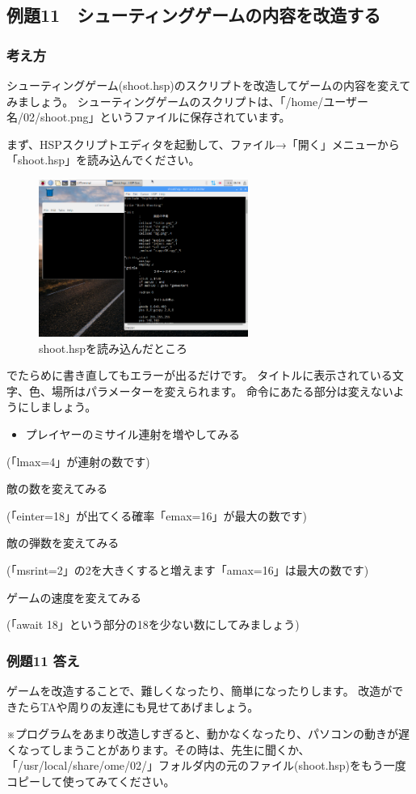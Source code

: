 \clearpage

\subsection{例題11　シューティングゲームの内容を改造する}

\subsubsection*{考え方}

シューティングゲーム(shoot.hsp)のスクリプトを改造してゲームの内容を変えてみましょう。
シューティングゲームのスクリプトは、「/home/ユーザー名/02/shoot.png」というファイルに保存されています。

まず、HSPスクリプトエディタを起動して、ファイル→「開く」メニューから「shoot.hsp」を読み込んでください。

\begin{figure}[H]
    \begin{center}
        \includegraphics[keepaspectratio,width=6.853cm,height=5.135cm]{text02-img/text02-img043.png}
        \caption{shoot.hspを読み込んだところ}
    \end{center}
\end{figure}

でたらめに書き直してもエラーが出るだけです。
タイトルに表示されている文字、色、場所はパラメーターを変えられます。
命令にあたる部分は変えないようにしましょう。

\begin{itemize}
    \item プレイヤーのミサイル連射を増やしてみる
\end{itemize}

\begin{description}
    \item (「lmax=4」が連射の数です)
    \item 敵の数を変えてみる
    \item (「einter=18」が出てくる確率「emax=16」が最大の数です)
    \item 敵の弾数を変えてみる
    \item (「msrint=2」の2を大きくすると増えます「amax=16」は最大の数です)
    \item ゲームの速度を変えてみる
    \item (「await 18」という部分の18を少ない数にしてみましょう)
\end{description}

\subsubsection*{例題11 答え}

ゲームを改造することで、難しくなったり、簡単になったりします。
改造ができたらTAや周りの友達にも見せてあげましょう。

※プログラムをあまり改造しすぎると、動かなくなったり、パソコンの動きが遅くなってしまうことがあります。その時は、先生に聞くか、「/usr/local/share/ome/02/」フォルダ内の元のファイル(shoot.hsp)をもう一度コピーして使ってみてください。
